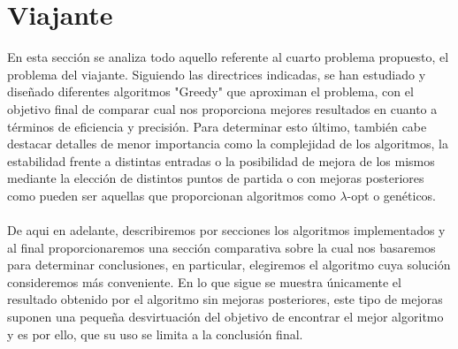 \documentclass[11pt,openany]{book}
\begin{document}
\chapter{Viajante} %
En esta sección se analiza todo aquello referente al cuarto problema propuesto,
el problema del viajante. Siguiendo las directrices indicadas, se han estudiado
y diseñado diferentes algoritmos "Greedy" que aproximan el problema, con el objetivo
final de comparar cual nos proporciona mejores resultados en cuanto a términos
de eficiencia y precisión. Para determinar esto último, también cabe destacar
detalles de menor importancia como la complejidad de los algoritmos, la estabilidad
frente a distintas entradas o la posibilidad de mejora de los mismos mediante la
elección de distintos puntos de partida o con mejoras posteriores como pueden ser 
aquellas que proporcionan algoritmos como $\lambda$-opt o genéticos.
\\ \\
De aqui en adelante, describiremos por secciones los algoritmos implementados y 
al final proporcionaremos una sección comparativa sobre la cual nos basaremos
para determinar conclusiones, en particular, elegiremos el algoritmo cuya
solución consideremos más conveniente. En lo que sigue se muestra únicamente
el resultado obtenido por el algoritmo sin mejoras posteriores, este tipo de mejoras
suponen una pequeña desvirtuación del objetivo de encontrar el mejor algoritmo y 
es por ello, que su uso se limita a la conclusión final.
\end{document}
